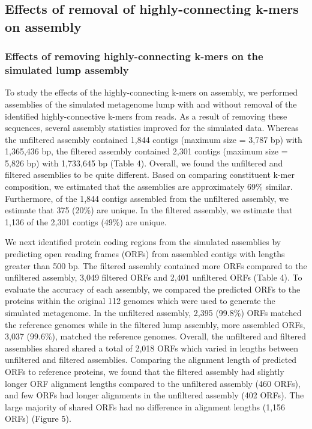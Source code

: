 \documentclass[11pt]{article} %
\begin{document}
\subsection{Effects of removal of highly-connecting k-mers on assembly}

\subsubsection{Effects of removing highly-connecting k-mers on the simulated lump assembly}
To study the effects of the highly-connecting k-mers on assembly, we performed assemblies of the simulated metagenome lump with and without removal of the identified highly-connective k-mers from reads.  As a result of removing these sequences, several assembly statistics improved for the simulated data.  Whereas the unfiltered assembly contained 1,844 contigs (maximum size = 3,787 bp) with 1,365,436 bp, the filtered assembly contained 2,301 contigs (maximum size = 5,826 bp) with 1,733,645 bp (Table 4).  Overall, we found the unfiltered and filtered assemblies to be quite different.  Based on comparing constituent k-mer composition, we estimated that the assemblies are approximately 69\% similar.  Furthermore, of the 1,844 contigs assembled from the unfiltered assembly, we estimate that 375 (20\%) are unique.  In the filtered assembly, we estimate that 1,136 of the 2,301 contigs (49\%) are unique. 
	
We next identified protein coding regions from the simulated assemblies by predicting open reading frames (ORFs) from assembled contigs with lengths greater than 500 bp.  The filtered assembly contained more ORFs compared to the unfiltered assembly, 3,049 filtered ORFs and 2,401 unfiltered ORFs (Table 4).  To evaluate the accuracy of each assembly, we compared the predicted ORFs to the proteins within the original 112 genomes which were used to generate the simulated metagenome.  In the unfiltered assembly, 2,395 (99.8\%) ORFs matched the reference genomes while in the filtered lump assembly, more assembled ORFs, 3,037 (99.6\%), matched the reference genomes.  Overall, the unfiltered and filtered assemblies shared shared a total of 2,018 ORFs which varied in lengths between unfiltered and filtered assemblies.  Comparing the alignment length of predicted ORFs to reference proteins, we found that the filtered assembly had slightly longer ORF alignment lengths compared to the unfiltered assembly (460 ORFs), and few ORFs had longer alignments in the unfiltered assembly (402 ORFs).  The large majority of shared ORFs had no difference in alignment lengths (1,156 ORFs) (Figure 5).  
\end{document}
